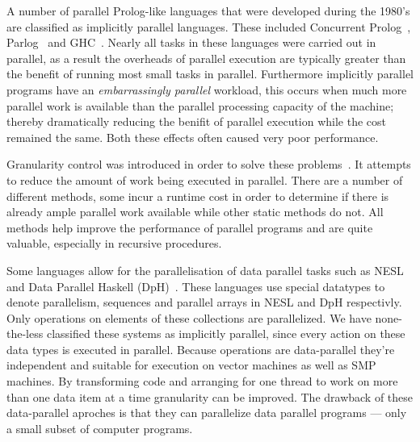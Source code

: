 A number of parallel Prolog-like languages that were developed during the
1980's are classified as implicitly parallel languages.
These included Concurrent
Prolog~\citep{saraswat85:probl_with_concur_prolog,saraswat86:concurrent_prolog_definition,shapiro:flat_concur_prolog},
Parlog~\citep{clark:84:parlog_sys_prog,clark:86:parlog} and GHC~\citep{ueda:ghc}.
Nearly all tasks in these languages were carried out in
parallel,
as a result the overheads of parallel execution are typically
greater than the benefit of running most small tasks in parallel.
Furthermore implicitly parallel programs have an \emph{embarrassingly
  parallel} workload,
this occurs when much more parallel work is available than the parallel
processing capacity of the machine;
thereby dramatically reducing the benifit of parallel execution while
the cost remained the same.
Both these effects often caused very poor performance.

Granularity control was introduced in order to solve these
problems~\citep{lopez96:distance_granularity,shen_98_granularity-control}.
It attempts to reduce the amount of work being executed in parallel.
There are a number of different methods, some incur a
runtime cost in order to determine if there is already ample parallel
work available while other static methods do not.
All methods help improve the performance of parallel programs and are
quite valuable, especially in recursive procedures.

Some languages allow for the parallelisation of data parallel
tasks such as NESL~\citep{blelloch:95:nesl} and Data Parallel
Haskell (DpH)~\citep{dph:2007:status_report,dph:2008:harnessing_the_multicores}.
These languages use special datatypes to denote parallelism,
sequences and parallel arrays in NESL and DpH respectivly.
Only operations on elements of these collections are parallelized.
We have none-the-less classified these systems as implicitly parallel,
since every action on these data types is executed in parallel.
Because operations are data-parallel they're independent and suitable
for execution on vector machines as well as SMP machines.
By transforming code and arranging for one thread to work on more than
one data item at a time granularity can be improved.
The drawback of these data-parallel aproches is that they can
parallelize data parallel programs
--- only a small subset of computer programs.

